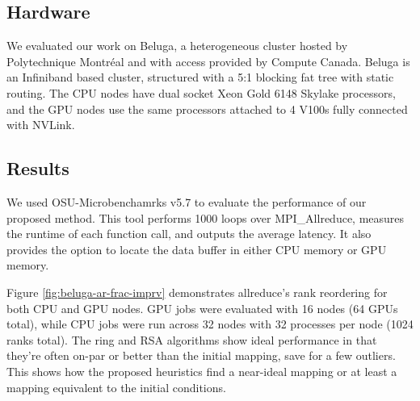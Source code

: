 \subsection{Hardware}\label{sec:topo-eval-hardware}

We evaluated our work on Beluga, a heterogeneous cluster hosted by Polytechnique Montréal and with access provided by Compute Canada. 
Beluga is an Infiniband based cluster, structured with a 5:1 blocking fat tree with static routing.
The CPU nodes have dual socket Xeon Gold 6148 Skylake processors, and the GPU nodes use the same processors attached to 4 V100s fully connected with NVLink.

\subsection{Results}

% 
% 
% 

We used OSU-Microbenchamrks v5.7 \cite{Bureddy2012OMB} to evaluate the performance of our proposed method. 
This tool performs 1000 loops over MPI\_Allreduce, measures the runtime of each function call, and outputs the average latency. 
It also provides the option to locate the data buffer in either CPU memory or GPU memory.

Figure \ref{fig:beluga-ar-frac-imprv} demonstrates allreduce's rank reordering for both CPU and GPU nodes.
GPU jobs were evaluated with 16 nodes (64 GPUs total), while CPU jobs were run across 32 nodes with 32 processes per node (1024 ranks total).
The ring and RSA algorithms show ideal performance in that they're often on-par or better than the initial mapping, save for a few outliers.
This shows how the proposed heuristics find a near-ideal mapping or at least a mapping equivalent to the initial conditions.

